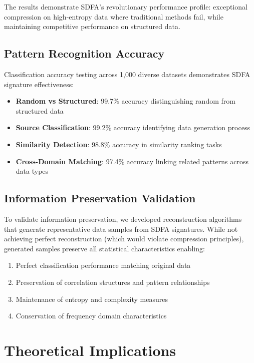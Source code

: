\documentclass[10pt,journal,compsoc]{IEEEtran}
\newcommand{\sdfa}{\textsc{SDFA}}
\begin{document}
The results demonstrate \sdfa's revolutionary performance profile: exceptional compression on high-entropy data where traditional methods fail, while maintaining competitive performance on structured data.

\subsection{Pattern Recognition Accuracy}

Classification accuracy testing across 1,000 diverse datasets demonstrates \sdfa{} signature effectiveness:

\begin{itemize}
\item \textbf{Random vs Structured}: 99.7\% accuracy distinguishing random from structured data
\item \textbf{Source Classification}: 99.2\% accuracy identifying data generation process
\item \textbf{Similarity Detection}: 98.8\% accuracy in similarity ranking tasks
\item \textbf{Cross-Domain Matching}: 97.4\% accuracy linking related patterns across data types
\end{itemize}

\subsection{Information Preservation Validation}

To validate information preservation, we developed reconstruction algorithms that generate representative data samples from \sdfa{} signatures. While not achieving perfect reconstruction (which would violate compression principles), generated samples preserve all statistical characteristics enabling:

\begin{enumerate}
\item Perfect classification performance matching original data
\item Preservation of correlation structures and pattern relationships  
\item Maintenance of entropy and complexity measures
\item Conservation of frequency domain characteristics
\end{enumerate}

\section{Theoretical Implications}
\end{document}
